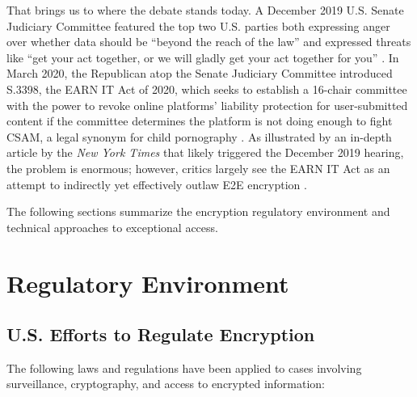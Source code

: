 That brings us to where the debate stands today. A December 2019 U.S. Senate Judiciary Committee featured the top two
U.S. parties both expressing anger over whether data should be ``beyond the reach of the law'' and expressed threats
like ``get your act together, or we will gladly get your act together for you'' \cite{geller_2019}. In March 2020, the
Republican atop the Senate Judiciary Committee introduced S.3398, the EARN IT Act of 2020, which seeks to establish a
16-chair committee with the power to revoke online platforms' liability protection for user-submitted content if the
committee determines the platform is not doing enough to fight \ac{CSAM}, a legal synonym for
child pornography \cite{graham_s3398_2020}. As illustrated by an in-depth article by the \textit{New York Times}
\cite{keller_internet_2019} that likely triggered the December 2019 hearing, the problem is enormous; however, critics
largely see the EARN IT Act as an attempt to indirectly yet effectively outlaw \ac{E2E} encryption \cite{newman_2020}
\cite{pfefferkorn_2020}.


The following sections summarize the encryption regulatory environment and technical approaches to exceptional access.



\section{Regulatory Environment}
\label{sec-reg-environment}


\subsection{U.S. Efforts to Regulate Encryption}

The following laws and regulations have been applied to cases involving surveillance, cryptography, and access to
encrypted information:

\newcommand{\lawsstart}{\begin{itemize}}
\newcommand{\law}[4]{ %
    \item #1: \textbf{#2} \cite{#3} \newline
    \parbox{\linewidth}{#4} \newline
}
\newcommand{\lawsend}{\end{itemize}}

